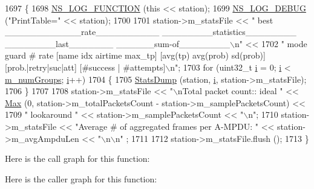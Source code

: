 \begin{DoxyCode}
1697 \{
1698   \hyperlink{log-macros-disabled_8h_a90b90d5bad1f39cb1b64923ea94c0761}{NS\_LOG\_FUNCTION} (\textcolor{keyword}{this} << station);
1699   \hyperlink{group__logging_ga413f1886406d49f59a6a0a89b77b4d0a}{NS\_LOG\_DEBUG} (\textcolor{stringliteral}{"PrintTable="} << station);
1700 
1701   station->m\_statsFile << \textcolor{stringliteral}{"               best   \_\_\_\_\_\_\_\_\_\_\_\_rate\_\_\_\_\_\_\_\_\_\_    \_\_\_\_\_\_\_\_statistics\_\_\_\_\_\_\_\_  
        \_\_\_\_\_\_\_\_last\_\_\_\_\_\_\_    \_\_\_\_\_\_sum-of\_\_\_\_\_\_\_\_\(\backslash\)n"} <<
1702     \textcolor{stringliteral}{" mode guard #  rate  [name   idx airtime  max\_tp]  [avg(tp) avg(prob) sd(prob)]  [prob.|retry|suc|att]
        [#success | #attempts]\(\backslash\)n"};
1703   \textcolor{keywordflow}{for} (uint32\_t \hyperlink{bernuolliDistribution_8m_a6f6ccfcf58b31cb6412107d9d5281426}{i} = 0; \hyperlink{bernuolliDistribution_8m_a6f6ccfcf58b31cb6412107d9d5281426}{i} < \hyperlink{classns3_1_1MinstrelHtWifiManager_a8a0964148ee665bab466b2858e8094b7}{m\_numGroups}; \hyperlink{bernuolliDistribution_8m_a6f6ccfcf58b31cb6412107d9d5281426}{i}++)
1704     \{
1705       \hyperlink{classns3_1_1MinstrelHtWifiManager_a11ef14d90291b78f771eec0d1dad712f}{StatsDump} (station, \hyperlink{bernuolliDistribution_8m_a6f6ccfcf58b31cb6412107d9d5281426}{i}, station->m\_statsFile);
1706     \}
1707 
1708   station->m\_statsFile << \textcolor{stringliteral}{"\(\backslash\)nTotal packet count::    ideal "} << \hyperlink{group__highprec_ga0d35bb9363c0da4cc2557158b95dbca0}{Max} (0, station->m\_totalPacketsCount - 
      station->m\_samplePacketsCount) <<
1709     \textcolor{stringliteral}{"              lookaround "} << station->m\_samplePacketsCount << \textcolor{stringliteral}{"\(\backslash\)n"};
1710   station->m\_statsFile << \textcolor{stringliteral}{"Average # of aggregated frames per A-MPDU: "} << station->m\_avgAmpduLen << \textcolor{stringliteral}{"\(\backslash\)n\(\backslash\)n"}
      ;
1711 
1712   station->m\_statsFile.flush ();
1713 \}
\end{DoxyCode}


Here is the call graph for this function\+:




Here is the caller graph for this function\+:



